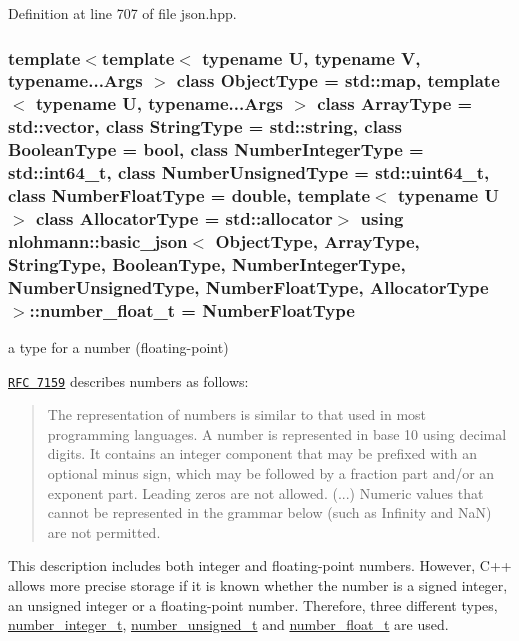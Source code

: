 Definition at line 707 of file json.\+hpp.

\hypertarget{classnlohmann_1_1basic__json_a74a0013e847fdc574b48f931f0e757e1}{}
\subsubsection[{number\+\_\+float\+\_\+t}]{\setlength{\rightskip}{0pt plus 5cm}template$<$template$<$ typename U, typename V, typename...\+Args $>$ class Object\+Type = std\+::map, template$<$ typename U, typename...\+Args $>$ class Array\+Type = std\+::vector, class String\+Type  = std\+::string, class Boolean\+Type  = bool, class Number\+Integer\+Type  = std\+::int64\+\_\+t, class Number\+Unsigned\+Type  = std\+::uint64\+\_\+t, class Number\+Float\+Type  = double, template$<$ typename U $>$ class Allocator\+Type = std\+::allocator$>$ using {\bf nlohmann\+::basic\+\_\+json}$<$ Object\+Type, Array\+Type, String\+Type, Boolean\+Type, Number\+Integer\+Type, Number\+Unsigned\+Type, Number\+Float\+Type, Allocator\+Type $>$\+::{\bf number\+\_\+float\+\_\+t} =  Number\+Float\+Type}\label{classnlohmann_1_1basic__json_a74a0013e847fdc574b48f931f0e757e1}


a type for a number (floating-\/point) 

\href{http://rfc7159.net/rfc7159}{\tt R\+F\+C 7159} describes numbers as follows\+: \begin{quote}
The representation of numbers is similar to that used in most programming languages. A number is represented in base 10 using decimal digits. It contains an integer component that may be prefixed with an optional minus sign, which may be followed by a fraction part and/or an exponent part. Leading zeros are not allowed. (...) Numeric values that cannot be represented in the grammar below (such as Infinity and Na\+N) are not permitted. \end{quote}


This description includes both integer and floating-\/point numbers. However, C++ allows more precise storage if it is known whether the number is a signed integer, an unsigned integer or a floating-\/point number. Therefore, three different types, \hyperlink{classnlohmann_1_1basic__json_ac4b10b2364f26ce47bdb9a413ff04a59}{number\+\_\+integer\+\_\+t}, \hyperlink{classnlohmann_1_1basic__json_a60a04166c122072ab11eaf9845d9cd1d}{number\+\_\+unsigned\+\_\+t} and \hyperlink{classnlohmann_1_1basic__json_a74a0013e847fdc574b48f931f0e757e1}{number\+\_\+float\+\_\+t} are used.

